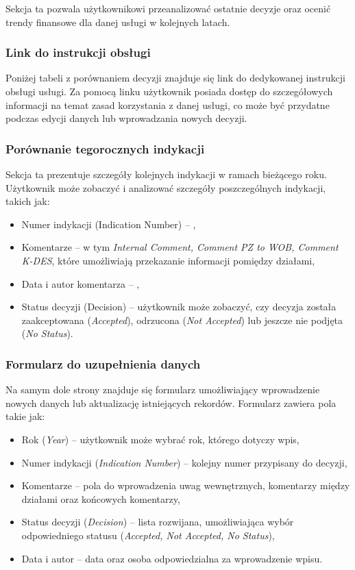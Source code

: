 Sekcja ta pozwala użytkownikowi przeanalizować ostatnie decyzje oraz ocenić trendy finansowe dla danej usługi w kolejnych latach.

\subsubsection{Link do instrukcji obsługi}
Poniżej tabeli z porównaniem decyzji znajduje się link do dedykowanej instrukcji obsługi usługi. Za pomocą linku użytkownik posiada dostęp do szczegółowych informacji na temat zasad korzystania z danej usługi, co może być przydatne podczas edycji danych lub wprowadzania nowych decyzji.

\subsubsection{Porównanie tegorocznych indykacji}
Sekcja ta prezentuje szczegóły kolejnych indykacji w ramach bieżącego roku. Użytkownik może zobaczyć i analizować szczegóły poszczególnych indykacji, takich jak:
\begin{itemize}
    \item {Numer indykacji (Indication Number)} -- ,
    \item {Komentarze} -- w tym \textit{Internal Comment, Comment PZ to WOB, Comment K-DES}, które umożliwiają przekazanie informacji pomiędzy działami,
    \item {Data i autor komentarza} -- ,
    \item {Status decyzji (Decision)} -- użytkownik może zobaczyć, czy decyzja została zaakceptowana (\textit{Accepted}), odrzucona (\textit{Not Accepted}) lub jeszcze nie podjęta (\textit{No Status}).
\end{itemize}

\subsubsection{Formularz do uzupełnienia danych}
Na samym dole strony znajduje się formularz umożliwiający wprowadzenie nowych danych lub aktualizację istniejących rekordów. Formularz zawiera pola takie jak:
\begin{itemize}
    \item {Rok (\textit{Year})} -- użytkownik może wybrać rok, którego dotyczy wpis,
    \item {Numer indykacji (\textit{Indication Number})} -- kolejny numer przypisany do decyzji,
    \item {Komentarze} -- pola do wprowadzenia uwag wewnętrznych, komentarzy między działami oraz końcowych komentarzy,
    \item {Status decyzji (\textit{Decision})} -- lista rozwijana, umożliwiająca wybór odpowiedniego statusu (\textit{Accepted, Not Accepted, No Status}),
    \item {Data i autor} -- data oraz osoba odpowiedzialna za wprowadzenie wpisu.
\end{itemize}

